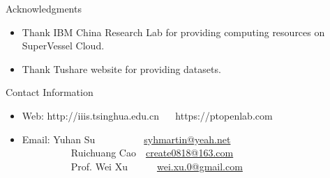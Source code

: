 \documentclass[final,hyperref={pdfpagelabels=false}]{beamer}
\begin{document}
\begin{frame}[t]
\begin{columns}[t]
\begin{column}{.445\textwidth}
\begin{block}{Acknowledgments}
\begin{itemize}
\item Thank IBM China Research Lab for providing computing resources on SuperVessel Cloud. 
\item Thank Tushare website for providing datasets. 
\end{itemize}

\end{block}



\begin{block}{Contact Information}

\begin{itemize}
\item Web: http://iiis.tsinghua.edu.cn ~~ https://ptopenlab.com \\


\item Email: Yuhan Su~~~~~~~~~~\href{mailto:syhmartin@yeah.ne}{syhmartin@yeah.net} \\ 
~~~~~~~~~~Ruichuang Cao~~\href{mailto:create0818@163.com}{create0818@163.com} \\
~~~~~~~~~~Prof. Wei Xu~~~~~~\href{mailto:wei.xu.0@gmail.com}{wei.xu.0@gmail.com}
\end{itemize}

\end{block}


\end{column} %

\begin{column}{.015\textwidth}\end{column} %

\end{columns} %

\end{frame} %
\end{document}
